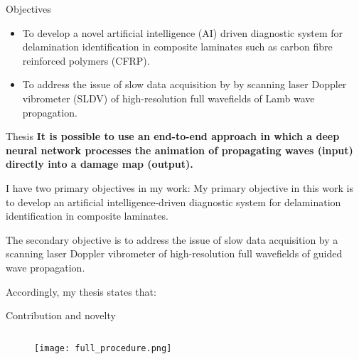 \documentclass[10pt,aspectratio=169,dvipsnames]{beamer} %
\begin{document}
	\begin{frame}{Objectives}
			\justifying
			\begin{itemize}
				\item {To develop \textcolor{logoblue}{a novel artificial intelligence (AI) driven diagnostic system} for delamination identification in composite laminates such as carbon fibre reinforced polymers (CFRP).}
				\item {To address the issue of \textcolor{logoblue}{slow data acquisition} by by scanning laser Doppler vibrometer (SLDV) of high-resolution full wavefields of Lamb wave propagation.}
			\end{itemize}
		\begin{tcolorbox}			
			\begin{alertblock}{Thesis}
				\justifying
				\textbf{It is possible to use an end-to-end approach in which a deep neural network	processes the animation of propagating waves (input) directly into a damage map (output).}
			\end{alertblock}
		\end{tcolorbox}		
	\end{frame}
	\note
	{
		I have two primary objectives in my work:
		My primary objective in this work is to develop an artificial intelligence-driven diagnostic system for delamination identification in composite laminates.
		
		The secondary objective is to address the issue of slow data acquisition by a scanning laser Doppler vibrometer of high-resolution full wavefields of guided wave propagation.
		
		Accordingly, my thesis states that:
	}
	\begin{frame}{Contribution and novelty}
		\begin{columns}[T]
			\begin{column}[c]{0.95\textwidth}
				\begin{figure}
					\centering
					\texttt{[image: full\_procedure.png]}	
				\end{figure}		
			\end{column}
		\end{columns}		
	\end{frame}
\end{document}
